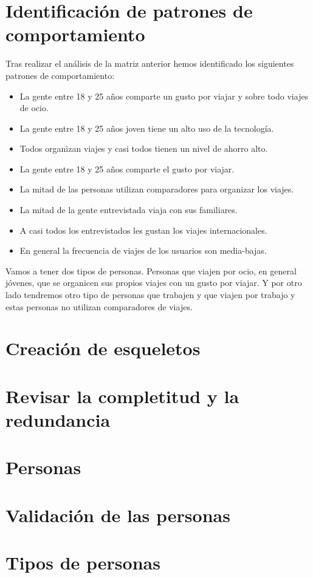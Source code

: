 \section{Identificación de patrones de comportamiento}
Tras realizar el análisis de la matriz anterior hemos identificado los siguientes patrones de comportamiento:
\begin{itemize}
    \item La gente entre 18 y 25 años comparte un gusto por viajar y sobre todo viajes de ocio.
    \item La gente entre 18 y 25 años joven tiene un alto uso de la tecnología.
    \item Todos organizan viajes y casi todos tienen un nivel de ahorro alto. 
    \item La gente entre 18 y 25 años comparte el gusto por viajar.
    \item La mitad de las personas utilizan comparadores para organizar los viajes.
    \item La mitad de la gente entrevistada viaja con sus familiares.
    \item A casi todos los entrevistados les gustan los viajes internacionales.
    \item En general la frecuencia de viajes de los usuarios son media-bajas.
\end{itemize}

Vamos a tener dos tipos de personas. Personas que viajen por ocio, en general jóvenes, que se organicen sus propios viajes con un gusto por viajar. Y por otro lado tendremos otro tipo de personas que trabajen y que viajen por trabajo y estas personas no utilizan comparadores de viajes.

\section{Creación de esqueletos}
\section{Revisar la completitud y la redundancia}
\section{Personas}
\section{Validación de las personas}
\section{Tipos de personas}